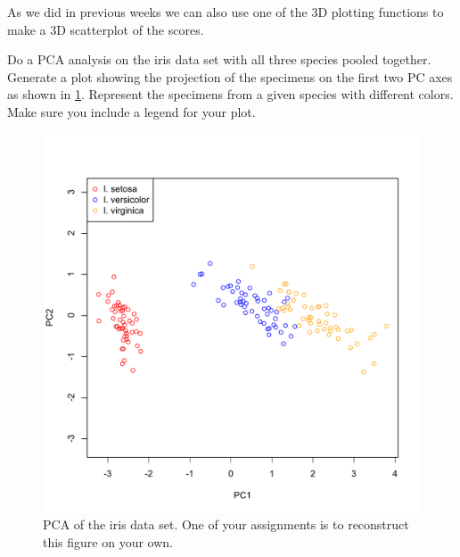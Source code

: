 As we did in previous weeks we can also use one of the 3D plotting functions to make a 3D scatterplot of the scores.



\begin{assignment}
Do a PCA analysis on the iris data set with all
three species pooled together. Generate a plot showing the projection of
the specimens on the first two PC axes as shown in \cref{fig:pca}.
Represent the specimens from a given species with different colors. Make
sure you include a legend for your plot.
\end{assignment}

\begin{figure}[htbp]
\centering
\includegraphics[width=0.5\columnwidth]{./figures/hands-on5/iris-all-pca.pdf}
\caption{PCA of the iris data set. One of your assignments is to
reconstruct this figure on your own.}\label{fig:pca}
\end{figure}

